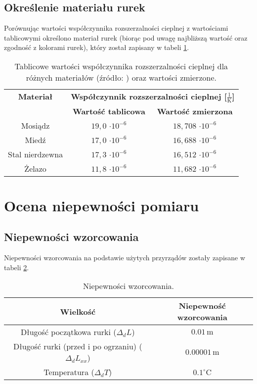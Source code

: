 \documentclass[a4paper,12pt]{article}
\begin{document}
\subsection{Określenie materiału rurek}

Porównując wartości współczynnika rozszerzalności cieplnej z wartościami tablicowymi określono materiał rurek (biorąc pod uwagę najbliższą wartość oraz zgodność z kolorami rurek), który został zapisany w tabeli \ref{tab:materiały}.

\begin{table}[H]
    \centering
    \begin{tabular}{|c|c|c|}
        \hline
        \textbf{Materiał} & \multicolumn{2}{c|}{\textbf{Współczynnik rozszerzalności cieplnej [$\frac{1}{\text{K}}$]}} \\
        \cline{2-3}
        & \textbf{Wartość tablicowa} & \textbf{Wartość zmierzona} \\
        \hline
        Mosiądz & $19{,}0$ $\cdot 10^{-6}$ & $18{,}708$ $\cdot 10^{-6}$ \\
        \hline
        Miedź & $17{,}0$ $\cdot 10^{-6}$ & $16{,}688$ $\cdot 10^{-6}$ \\
        \hline
        Stal nierdzewna & $17{,}3$ $\cdot 10^{-6}$ & $16{,}512$ $\cdot 10^{-6}$ \\
        \hline
        Żelazo & $11{,}8$ $\cdot 10^{-6}$ & $11{,}682$ $\cdot 10^{-6}$ \\
        \hline
    \end{tabular}
    \caption{Tablicowe wartości współczynnika rozszerzalności cieplnej dla różnych materiałów (źródło: \cite{wspolczynnik_rozszeralnosci}) oraz wartości zmierzone.}
    \label{tab:materiały}
\end{table}

\section{Ocena niepewności pomiaru}


\subsection{Niepewności wzorcowania}

Niepewności wzorcowania na podstawie użytych przyrządów zostały zapisane w tabeli \ref{tab:niepewnosci}.

\begin{table}[H]
    \centering
    \begin{tabular}{|c|c|}
        \hline
        \textbf{Wielkość} & \textbf{Niepewność wzorcowania} \\
        \hline
        Długość początkowa rurki ($\Delta_d L$) & $0.01\,\text{m}$ \\
        \hline
        Długość rurki (przed i po ogrzaniu) ($\Delta_d L_{xx}$) & $0.00001\,\text{m}$ \\
        \hline
        Temperatura ($\Delta_d T$) & $0.1^\circ\text{C}$ \\
        \hline
    \end{tabular}
    \caption{Niepewności wzorcowania.}
    \label{tab:niepewnosci}
\end{table}
\end{document}
